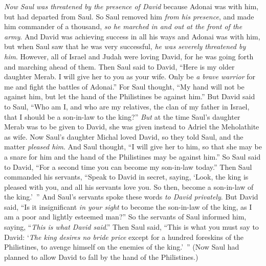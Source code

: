 \begin{biblechapter}
\verse \textit{Now Saul was threatened by the presence of David} because Adonai was with him, but had departed from Saul.
\verse So Saul removed him \textit{from his presence}, and made him commander of a thousand, \textit{so he marched in and out at the front of the army}.
\verse And David was achieving success in all his ways and Adonai was with him,
\verse but when Saul saw that he was very successful, \textit{he was severely threatened by him}.
\verse However, all of Israel and Judah were loving David, for he was going forth and marching ahead of them.
 Then Saul said to David, “Here is my older daughter Merab. I will give her to you as your wife. Only be \textit{a brave warrior} for me and fight the battles of Adonai.” For Saul thought, “My hand will not be against him, but let the hand of the Philistines be against him.”
\verse But David said to Saul, “Who am I, and who are my relatives, the clan of my father in Israel, that I should be a son-in-law to the king?”
\verse \textit{But} at the time Saul’s daughter Merab was to be given to David, she was given instead to Adriel the Meholathite as wife.
\verse Now Saul’s daughter Michal loved David, so they told Saul, and the matter \textit{pleased him}.
\verse And Saul thought, “I will give her to him, so that she may be a snare for him and the hand of the Philistines may be against him.” So Saul said to David, “For a second time you can become my son-in-law today.”
\verse Then Saul commanded his servants, “Speak to David in secret, saying, ‘Look, the king is pleased with you, and all his servants love you. So then, become a son-in-law of the king.’ ”
\verse And Saul’s servants spoke these words \textit{to David privately}. But David said, “Is it insignificant \textit{in your sight} to become the son-in-law of the king, as I am a poor and lightly esteemed man?”
\verse So the servants of Saul informed him, saying, “\textit{This is what David said}.”
\verse Then Saul said, “This is what you must say to David: ‘\textit{The king desires no bride price} except for a hundred foreskins of the Philistines, to avenge himself on the enemies of the king.’ ” (Now Saul had planned to allow David to fall by the hand of the Philistines.)

\end{biblechapter}

